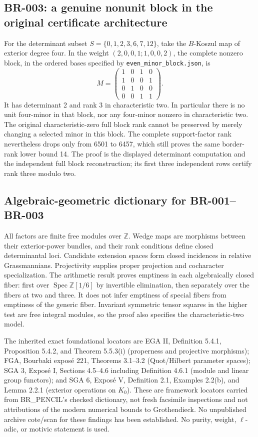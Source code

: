 \subsection*{BR-003: a genuine nonunit block in the original certificate architecture}
For the determinant subset $S=\{0,1,2,3,6,7,12\}$, take the $B$-Koszul map
of exterior degree four.  In the weight
$(2,0,0,1;1,0,0,2)$, the complete nonzero block, in the ordered bases specified
by \texttt{even\_minor\_block.json}, is
\[
 M=\begin{pmatrix}
 1&0&1&0\\1&0&0&1\\0&1&0&0\\0&0&1&1
 \end{pmatrix}.
\]
It has determinant 2 and rank 3 in characteristic two.  In particular
there is no unit four-minor in that block, nor any four-minor nonzero in
characteristic two.  The original characteristic-zero full block rank cannot
be preserved by merely changing a selected minor in this block.
The complete support-factor rank nevertheless drops only from 6501 to 6457,
which still proves the same border-rank lower bound 14.
The proof is the displayed determinant computation and the independent full
block reconstruction; its first three independent rows certify rank three
modulo two.

\subsection*{Algebraic-geometric dictionary for BR-001--BR-003}
All factors are finite free modules over $\mathbb Z$.  Wedge maps are morphisms
between their exterior-power bundles, and their rank conditions define
closed determinantal loci.  Candidate extension spaces form closed incidences
in relative Grassmannians.  Projectivity supplies proper projection and
cocharacter specialization.  The arithmetic result proves emptiness in each
algebraically closed fiber: first over $\operatorname{Spec}\mathbb Z[1/6]$
by invertible elimination, then separately over the fibers at two and three.
It does not infer emptiness of special fibers from emptiness of the generic
fiber.  Invariant symmetric tensor squares in the higher test are free
integral modules, so the proof also specifies the characteristic-two model.

The inherited exact foundational locators are EGA II, Definition 5.4.1,
Proposition 5.4.2, and Theorem 5.5.3(i) (properness and projective morphisms);
FGA, Bourbaki expos\'e 221, Theorems 3.1--3.2 (Quot/Hilbert parameter spaces);
SGA 3, Expos\'e I, Sections 4.5--4.6 including Definition 4.6.1 (module and
linear group functors); and SGA 6, Expos\'e V, Definition 2.1, Examples 2.2(b),
and Lemma 2.2.1 (exterior operations on $K_0$).  These are framework locators
carried from BR\_PENCIL's checked dictionary, not fresh facsimile inspections
and not attributions of the modern numerical bounds to Grothendieck.
No unpublished archive cote/scan for these findings has been established.
No purity, weight, $\ell$-adic, or motivic statement is used.
